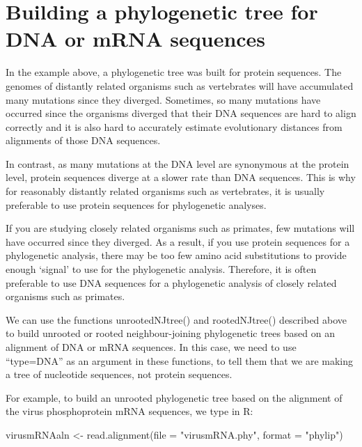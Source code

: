 \documentclass[
]{book}
\newenvironment{Shaded}{\begin{snugshade}}{\end{snugshade}}
\newcommand{\AttributeTok}[1]{\textcolor[rgb]{0.77,0.63,0.00}{#1}}
\newcommand{\FunctionTok}[1]{\textcolor[rgb]{0.00,0.00,0.00}{#1}}
\newcommand{\NormalTok}[1]{#1}
\newcommand{\OtherTok}[1]{\textcolor[rgb]{0.56,0.35,0.01}{#1}}
\newcommand{\StringTok}[1]{\textcolor[rgb]{0.31,0.60,0.02}{#1}}
\begin{document}
\hypertarget{building-a-phylogenetic-tree-for-dna-or-mrna-sequences}{%
\section{Building a phylogenetic tree for DNA or mRNA sequences}\label{building-a-phylogenetic-tree-for-dna-or-mrna-sequences}}

In the example above, a phylogenetic tree was built for protein sequences. The genomes of distantly related organisms such as vertebrates will have accumulated many mutations since they diverged. Sometimes, so many mutations have occurred since the organisms diverged that their DNA sequences are hard to align correctly and it is also hard to accurately estimate evolutionary distances from alignments of those DNA sequences.

In contrast, as many mutations at the DNA level are synonymous at the protein level, protein sequences diverge at a slower rate than DNA sequences. This is why for reasonably distantly related organisms such as vertebrates, it is usually preferable to use protein sequences for phylogenetic analyses.

If you are studying closely related organisms such as primates, few mutations will have occurred since they diverged. As a result, if you use protein sequences for a phylogenetic analysis, there may be too few amino acid substitutions to provide enough `signal' to use for the phylogenetic analysis. Therefore, it is often preferable to use DNA sequences for a phylogenetic analysis of closely related organisms such as primates.

We can use the functions unrootedNJtree() and rootedNJtree() described above to build unrooted or rooted neighbour-joining phylogenetic trees based on an alignment of DNA or mRNA sequences. In this case, we need to use ``type=DNA'' as an argument in these functions, to tell them that we are making a tree of nucleotide sequences, not protein sequences.

For example, to build an unrooted phylogenetic tree based on the alignment of the virus phosphoprotein mRNA sequences, we type in R:

\begin{Shaded}
\begin{Highlighting}[]
\NormalTok{virusmRNAaln  }\OtherTok{\textless{}{-}} \FunctionTok{read.alignment}\NormalTok{(}\AttributeTok{file =} \StringTok{"virusmRNA.phy"}\NormalTok{, }\AttributeTok{format =} \StringTok{"phylip"}\NormalTok{)}
\end{Highlighting}
\end{Shaded}
\end{document}
